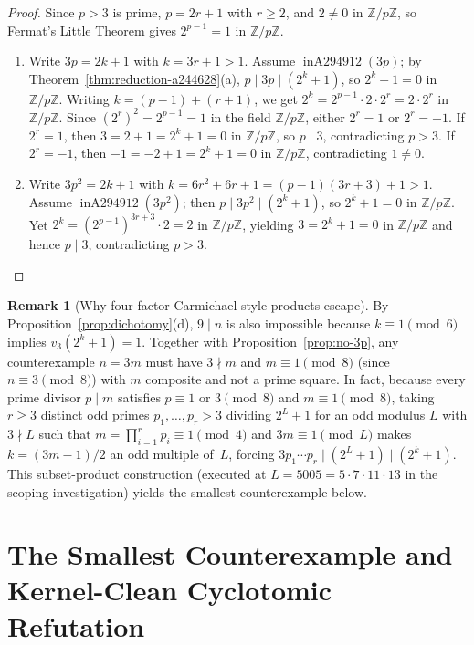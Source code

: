 \documentclass[11pt]{article}
\theoremstyle{definition}
\newtheorem{remark}[theorem]{Remark}
\newcommand{\Z}{\mathbb{Z}}
\newcommand{\inA}{\operatorname{inA294912}}
\begin{document}
\begin{proof}
Since $p > 3$ is prime, $p = 2r + 1$ with $r \ge 2$, and $2 \ne 0$ in $\Z/p\Z$, so Fermat's Little Theorem gives $2^{p-1} = 1$ in $\Z/p\Z$.
\begin{enumerate}
\item[\textup{(a)}] Write $3p = 2k + 1$ with $k = 3r + 1 > 1$. Assume $\inA(3p)$; by Theorem~\ref{thm:reduction-a244628}(a), $p \mid 3p \mid (2^k + 1)$, so $2^k + 1 = 0$ in $\Z/p\Z$. Writing $k = (p - 1) + (r + 1)$, we get $2^k = 2^{p-1} \cdot 2 \cdot 2^r = 2 \cdot 2^r$ in $\Z/p\Z$. Since $(2^r)^2 = 2^{p-1} = 1$ in the field $\Z/p\Z$, either $2^r = 1$ or $2^r = -1$. If $2^r = 1$, then $3 = 2 + 1 = 2^k + 1 = 0$ in $\Z/p\Z$, so $p \mid 3$, contradicting $p > 3$. If $2^r = -1$, then $-1 = -2 + 1 = 2^k + 1 = 0$ in $\Z/p\Z$, contradicting $1 \ne 0$.
\item[\textup{(b)}] Write $3p^2 = 2k + 1$ with $k = 6r^2 + 6r + 1 = (p - 1)(3r + 3) + 1 > 1$. Assume $\inA(3p^2)$; then $p \mid 3p^2 \mid (2^k + 1)$, so $2^k + 1 = 0$ in $\Z/p\Z$. Yet $2^k = (2^{p-1})^{3r+3} \cdot 2 = 2$ in $\Z/p\Z$, yielding $3 = 2^k + 1 = 0$ in $\Z/p\Z$ and hence $p \mid 3$, contradicting $p > 3$. \qedhere
\end{enumerate}
\end{proof}

\begin{remark}[Why four-factor Carmichael-style products escape]
By Proposition~\ref{prop:dichotomy}(d), $9 \mid n$ is also impossible because $k \equiv 1 \pmod 6$ implies $v_3(2^k + 1) = 1$. Together with Proposition~\ref{prop:no-3p}, any counterexample $n = 3m$ must have $3 \nmid m$ and $m \equiv 1 \pmod 8$ (since $n \equiv 3 \pmod 8$) with $m$ composite and not a prime square. In fact, because every prime divisor $p \mid m$ satisfies $p \equiv 1 \text{ or } 3 \pmod 8$ and $m \equiv 1 \pmod 8$, taking $r \ge 3$ distinct odd primes $p_1, \dots, p_r > 3$ dividing $2^L + 1$ for an odd modulus $L$ with $3 \nmid L$ such that $m = \prod_{i=1}^r p_i \equiv 1 \pmod 4$ and $3m \equiv 1 \pmod L$ makes $k = (3m - 1)/2$ an odd multiple of~$L$, forcing $3 p_1 \cdots p_r \mid (2^L + 1) \mid (2^k + 1)$. This subset-product construction (executed at $L = 5005 = 5 \cdot 7 \cdot 11 \cdot 13$ in the scoping investigation) yields the smallest counterexample below.
\end{remark}

\section{The Smallest Counterexample and Kernel-Clean Cyclotomic Refutation}
\label{sec:witness}
\end{document}
